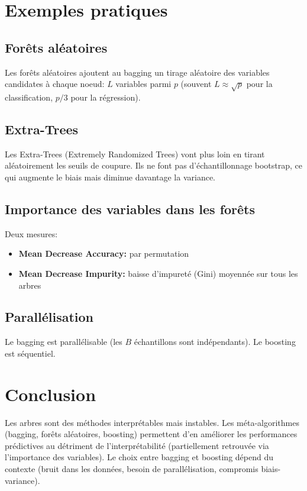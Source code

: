 \documentclass[a4paper,12pt]{article}
\begin{document}
\section{Exemples pratiques}

\subsection{Forêts aléatoires}
Les forêts aléatoires ajoutent au bagging un tirage aléatoire des variables candidates à chaque noeud: $L$ variables parmi $p$ (souvent $L \approx \sqrt{p}$ pour la classification, $p/3$ pour la régression).

\subsection{Extra-Trees}
Les Extra-Trees (Extremely Randomized Trees) vont plus loin en tirant aléatoirement les seuils de coupure. Ils ne font pas d'échantillonnage bootstrap, ce qui augmente le biais mais diminue davantage la variance.

\subsection{Importance des variables dans les forêts}
Deux mesures:
\begin{itemize}
  \item \textbf{Mean Decrease Accuracy:} par permutation
  \item \textbf{Mean Decrease Impurity:} baisse d'impureté (Gini) moyennée sur tous les arbres
\end{itemize}

\subsection{Parallélisation}
Le bagging est parallélisable (les $B$ échantillons sont indépendants). Le boosting est séquentiel.

\section{Conclusion}
Les arbres sont des méthodes interprétables mais instables. Les méta-algorithmes (bagging, forêts aléatoires, boosting) permettent d'en améliorer les performances prédictives au détriment de l'interprétabilité (partiellement retrouvée via l'importance des variables). Le choix entre bagging et boosting dépend du contexte (bruit dans les données, besoin de parallélisation, compromis biais-variance).
\end{document}
